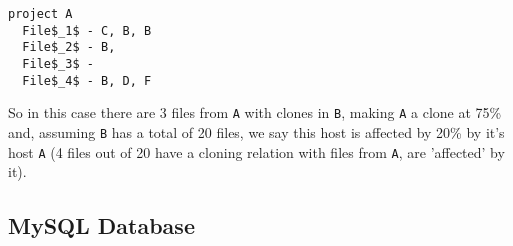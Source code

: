 \begin{lstlisting}[mathescape, numbers=none]
project A
  File$_1$ - C, B, B
  File$_2$ - B,
  File$_3$ - 
  File$_4$ - B, D, F
\end{lstlisting}
%
So in this case there are 3 files from \texttt{A} with clones in \texttt{B}, making \texttt{A} a clone at 75\% and, assuming \texttt{B} has a total of 20 files, we say this host is affected by 20\% by it's host \texttt{A} (4 files out of 20 have a cloning relation with files from \texttt{A}, are 'affected' by it).

\subsection{MySQL Database}

